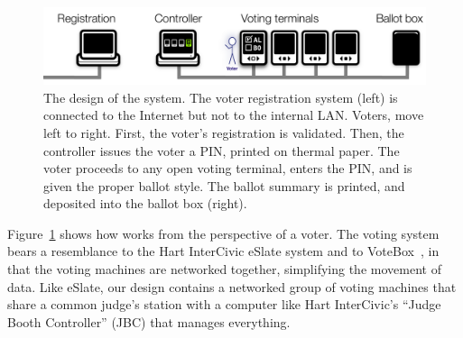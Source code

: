 \label{sec:voterflow}

\begin{figure}
\includegraphics[width=5.5in]{system-layout}
\caption{The design of the \projname system. The voter registration
  system (left) is connected to the Internet but not to the internal
  LAN. Voters, move left to right. First, the voter's registration
  is validated. Then, the controller issues the voter a PIN, printed on thermal
  paper. The voter proceeds to any open voting terminal, enters the
  PIN, and is given the proper ballot style. The ballot summary is
  printed, and deposited into the ballot box
  (right). \label{fig:design}}

\end{figure}

Figure~\ref{fig:design} shows how \projname works from the perspective
of a voter. 
The \projname voting system bears a resemblance to the Hart InterCivic eSlate system and to VoteBox~\cite{sandler08votebox}, in that the voting machines are networked together, 
simplifying the movement of data. 
Like eSlate, our design contains a networked group of voting machines that share a common judge's station with a computer like Hart InterCivic's ``Judge Booth Controller'' (JBC) that manages everything. 


